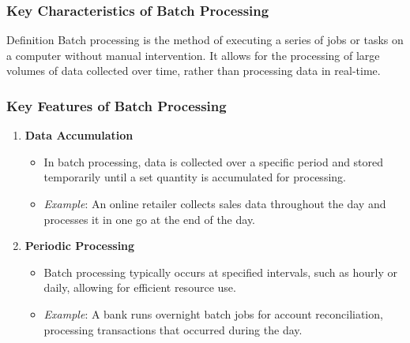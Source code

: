 \documentclass[aspectratio=169]{beamer}
\begin{document}
\begin{frame}[fragile]
    \frametitle{Key Characteristics of Batch Processing}
    \begin{block}{Definition}
        Batch processing is the method of executing a series of jobs or tasks on a computer without manual intervention. 
        It allows for the processing of large volumes of data collected over time, rather than processing data in real-time.
    \end{block}
\end{frame}

\begin{frame}[fragile]
    \frametitle{Key Features of Batch Processing}
    \begin{enumerate}
        \item \textbf{Data Accumulation}
            \begin{itemize}
                \item In batch processing, data is collected over a specific period and stored temporarily until a set quantity is accumulated for processing.
                \item \textit{Example}: An online retailer collects sales data throughout the day and processes it in one go at the end of the day.
            \end{itemize}
        \item \textbf{Periodic Processing}
            \begin{itemize}
                \item Batch processing typically occurs at specified intervals, such as hourly or daily, allowing for efficient resource use.
                \item \textit{Example}: A bank runs overnight batch jobs for account reconciliation, processing transactions that occurred during the day.
            \end{itemize}
    \end{enumerate}
\end{frame}
\end{document}
